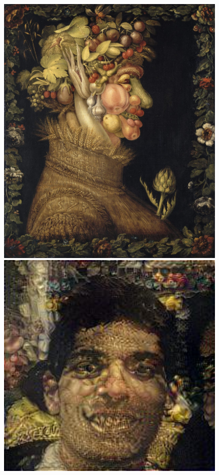 \documentclass{article}
\begin{document}
\begin{figure}[!htb]
\centering
\begin{minipage}{0.25\textwidth}
\centering
\includegraphics[width=0.98\textwidth]{../Images/arcimboldo.jpg}
\end{minipage}%
\begin{minipage}{0.25\textwidth}
\centering
\includegraphics[width=0.98\textwidth]{../Images/transfer/tdf_arcimboldo.jpg}

\end{minipage}
\end{figure}
\end{document}
